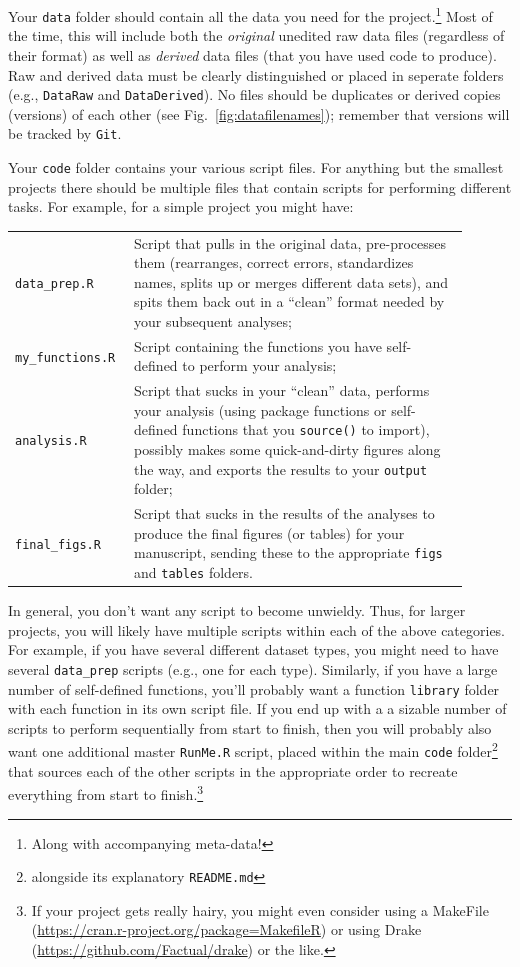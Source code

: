 \documentclass[12pt,letterpaper]{article}
\begin{document}
Your \texttt{data} folder should contain all the data you need for the project.\footnote{Along with 
accompanying meta-data!}
Most of the time, this will include both the \emph{original} unedited raw data files (regardless of their 
format) as well as \emph{derived} data files (that you have used code to produce).
Raw and derived data must be clearly distinguished or placed in seperate folders (e.g., 
\texttt{DataRaw} and \texttt{DataDerived}).
No files should be duplicates or derived copies (versions) of each other (see 
Fig.~\ref{fig:datafilenames});
remember that versions will be tracked by \texttt{Git}.

Your \texttt{code} folder contains your various script files.
For anything but the smallest projects there should be multiple files that contain scripts for 
performing different tasks.
For example, for a simple project you might have:

\begin{tabular}{p{0.2\linewidth}p{0.7\linewidth}}
	\texttt{data\_prep.R} & Script that pulls in the original data,
	pre-processes them (rearranges, correct errors, standardizes names, splits up or merges different 
	data sets),
	and spits them back out in a ``clean'' format needed by your subsequent analyses; \\
	\texttt{my\_functions.R} & Script containing the functions you have self-defined to perform your 
	analysis; \\
	\texttt{analysis.R} & Script that sucks in your ``clean'' data,
	performs your analysis (using package functions or self-defined functions that you 
	\texttt{source()} to import),
	possibly makes some quick-and-dirty figures along the way,
	and exports the results to your \texttt{output} folder; \\
	\texttt{final\_figs.R} & Script that sucks in the results of the analyses to produce the final figures 
	(or tables) for your manuscript, sending these to the appropriate \texttt{figs} and \texttt{tables} 
	folders.
\end{tabular}

In general, you don't want any script to become unwieldy.
Thus, for larger projects, you will likely have multiple scripts within each of the above categories.
For example, if you have several different dataset types, you might need to have several 
\texttt{data\_prep} scripts (e.g., one for each type).
Similarly, if you have a large number of self-defined functions, you'll probably want a function 
\texttt{library} folder with each function in its own script file.
If you end up with a a sizable number of scripts to perform sequentially from start to finish,
then you will probably also want one additional master \texttt{RunMe.R} script, placed within the 
main \texttt{code} folder\footnote{alongside its explanatory \texttt{README.md}} that sources each 
of the other scripts in the appropriate order to recreate everything from start to finish.\footnote{If 
your project gets really hairy, you might even consider using a MakeFile 
(\url{https://cran.r-project.org/package=MakefileR}) or using Drake 
(\url{https://github.com/Factual/drake}) or the like.}
\end{document}
